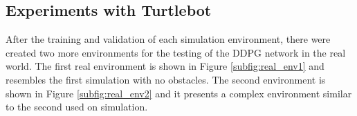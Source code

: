 
\subsection*{Experiments with Turtlebot}

After the training and validation of each simulation environment, there were created two more environments for the testing of the DDPG network in the real world.
The first real environment is shown in {\color{blue}Figure} \ref{subfig:real_env1} and resembles the first simulation with no obstacles. The second environment is shown in {\color{blue}Figure} \ref{subfig:real_env2} and it presents a complex environment similar to the second used on simulation.

